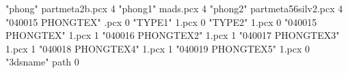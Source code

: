 "phong" partmeta\map2b.pcx 4
"phong1" mads\lavflip.pcx 4
"phong2" partmeta\256silv2.pcx 4
"040015 PHONGTEX" \engine\textures\linier.pcx 0
"TYPE1" \engine\textures\atex1.pcx 0
"TYPE2" \engine\pic1.pcx 0
"040015 PHONGTEX" \engine\textures\atex1.pcx 1
"040016 PHONGTEX2" \engine\textures\atex1.pcx 1
"040017 PHONGTEX3" \engine\textures\atex1.pcx 1
"040018 PHONGTEX4" \engine\textures\atex1.pcx 1
"040019 PHONGTEX5" \engine\textures\atex1.pcx 0
"3dsname" path 0



